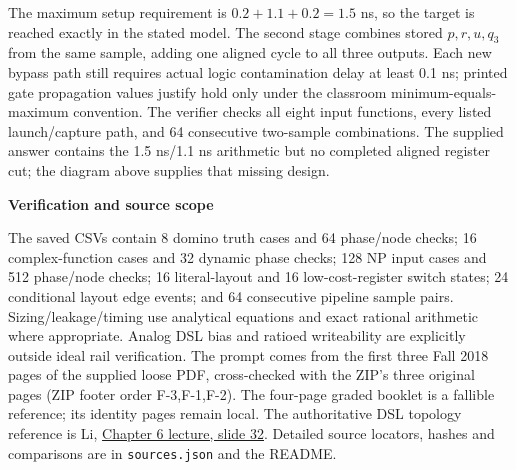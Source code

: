 \documentclass[10pt]{article}
\newcommand{\qheading}[1]{\par\medskip\textbf{#1}\par}
\begin{document}
The maximum setup requirement is $0.2+1.1+0.2=1.5$ ns, so the target is reached exactly in the stated model. The second stage combines stored $p,r,u,q_3$ from the same sample, adding one aligned cycle to all three outputs. Each new bypass path still requires actual logic contamination delay at least 0.1 ns; printed gate propagation values justify hold only under the classroom minimum-equals-maximum convention.
The verifier checks all eight input functions, every listed launch/capture path, and 64 consecutive two-sample combinations. The supplied answer contains the 1.5 ns/1.1 ns arithmetic but no completed aligned register cut; the diagram above supplies that missing design.
\qheading{Verification and source scope}
The saved CSVs contain 8 domino truth cases and 64 phase/node checks; 16 complex-function cases and 32 dynamic phase checks; 128 NP input cases and 512 phase/node checks; 16 literal-layout and 16 low-cost-register switch states; 24 conditional layout edge events; and 64 consecutive pipeline sample pairs. Sizing/leakage/timing use analytical equations and exact rational arithmetic where appropriate. Analog DSL bias and ratioed writeability are explicitly outside ideal rail verification.
The prompt comes from the first three Fall 2018 pages of the supplied loose PDF, cross-checked with the ZIP's three original pages (ZIP footer order F-3,F-1,F-2). The four-page graded booklet is a fallible reference; its identity pages remain local. The authoritative DSL topology reference is Li, \href{https://www.ee.ncu.edu.tw/jfli/public_html/VLSI/lecture/ch06.pdf}{Chapter 6 lecture, slide 32}. Detailed source locators, hashes and comparisons are in \texttt{sources.json} and the README.
\end{document}

